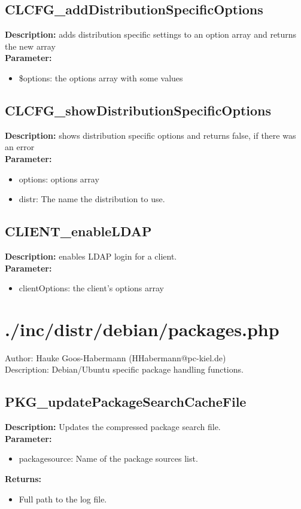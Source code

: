 \subsection{CLCFG\_addDistributionSpecificOptions}
\textbf{Description:} adds distribution specific settings to an option array and returns the new array\\
\textbf{Parameter:}
\begin{itemize}
\item \$options: the options array with some values
\end{itemize}

\subsection{CLCFG\_showDistributionSpecificOptions}
\textbf{Description:} shows distribution specific options and returns false, if there was an error\\
\textbf{Parameter:}
\begin{itemize}
\item options: options array
\item distr: The name the distribution to use.
\end{itemize}

\subsection{CLIENT\_enableLDAP}
\textbf{Description:} enables LDAP login for a client.\\
\textbf{Parameter:}
\begin{itemize}
\item clientOptions: the client's options array
\end{itemize}

\newpage\section{./inc/distr/debian/packages.php}
 Author: Hauke Goos-Habermann (HHabermann@pc-kiel.de)\\
 Description: Debian/Ubuntu specific package handling functions.\\

\subsection{PKG\_updatePackageSearchCacheFile}
\textbf{Description:} Updates the compressed package search file.\\
\textbf{Parameter:}
\begin{itemize}
\item packagesource: Name of the package sources list.
\end{itemize}
\textbf{Returns:}
\begin{itemize}
\item Full path to the log file.
\end{itemize}

